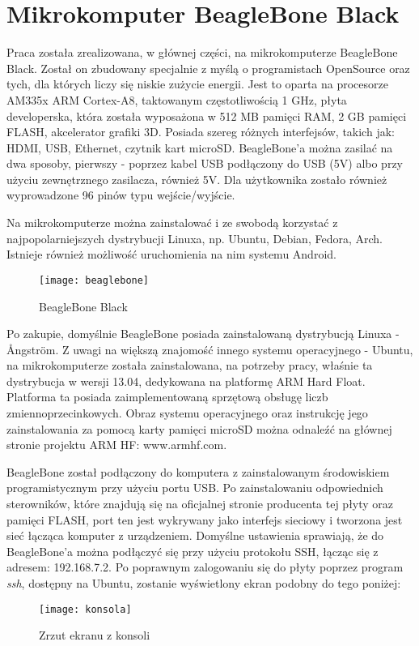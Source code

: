 \chapter{Mikrokomputer BeagleBone Black}
Praca została zrealizowana, w głównej części, na mikrokomputerze BeagleBone Black. Został on zbudowany specjalnie z myślą o programistach OpenSource oraz tych, dla których liczy się niskie zużycie energii. Jest to oparta na procesorze AM335x ARM Cortex-A8, taktowanym częstotliwością 1 GHz, płyta developerska, która została wyposażona w 512 MB pamięci RAM, 2 GB pamięci FLASH, akcelerator grafiki 3D. Posiada szereg różnych interfejsów, takich jak: HDMI, USB, Ethernet, czytnik kart microSD. BeagleBone'a można zasilać na dwa sposoby, pierwszy - poprzez kabel USB podłączony do USB (5V) albo przy użyciu zewnętrznego zasilacza, również 5V. Dla użytkownika zostało również wyprowadzone 96 pinów typu wejście/wyjście.

Na mikrokomputerze można zainstalować i ze swobodą korzystać z najpopolarniejszych dystrybucji Linuxa, np. Ubuntu, Debian, Fedora, Arch. Istnieje również możliwość uruchomienia na nim systemu Android.

\begin{figure}[h]
\centering
\texttt{[image: beaglebone]}
\caption{BeagleBone Black}
\label{fig:beaglebone}
\end{figure}

Po zakupie, domyślnie BeagleBone posiada zainstalowaną dystrybucją Linuxa - Ångström. Z uwagi na większą znajomość innego systemu operacyjnego - Ubuntu, na mikrokomputerze została zainstalowana, na potrzeby pracy, właśnie ta dystrybucja w wersji 13.04, dedykowana na platformę ARM Hard Float. Platforma ta posiada zaimplementowaną sprzętową obsługę liczb zmiennoprzecinkowych. Obraz systemu operacyjnego oraz instrukcję jego zainstalowania za pomocą karty pamięci microSD można odnaleźć na głównej stronie projektu ARM HF: www.armhf.com.

BeagleBone został podłączony do komputera z zainstalowanym środowiskiem programistycznym przy użyciu portu USB. Po zainstalowaniu odpowiednich sterowników, które znajdują się na oficjalnej stronie producenta tej płyty oraz pamięci FLASH, port ten jest wykrywany jako interfejs sieciowy i tworzona jest sieć łącząca komputer z urządzeniem. Domyślne ustawienia sprawiają, że do BeagleBone'a można podłączyć się przy użyciu protokołu SSH, łącząc się z adresem: 192.168.7.2. Po poprawnym zalogowaniu się do płyty poprzez program \emph{ssh}, dostępny na Ubuntu, zostanie wyświetlony ekran podobny do tego poniżej:

\begin{figure}[h]
\centering
\texttt{[image: konsola]}
\caption{Zrzut ekranu z konsoli}
\label{fig:konsola}
\end{figure}